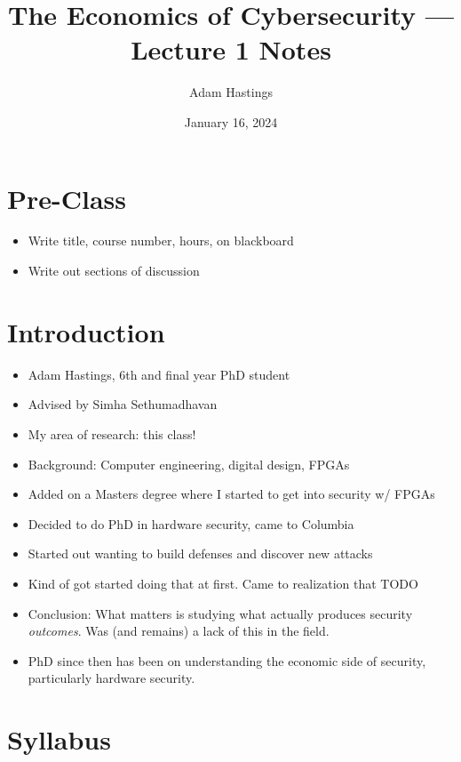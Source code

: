 \documentclass[11pt]{article}
\title{The Economics of Cybersecurity --- Lecture 1 Notes}
\date{January 16, 2024}
\author{Adam Hastings}
\begin{document}
\maketitle

\section*{Pre-Class}
\begin{itemize}
    \item Write title, course number, hours, on blackboard
    \item Write out sections of discussion
\end{itemize}

\section{Introduction}
\begin{itemize}
    \item Adam Hastings, 6th and final year PhD student
    \item Advised by Simha Sethumadhavan
    \item My area of research: this class! 
    \item Background: Computer engineering, digital design, FPGAs
    \item Added on a Masters degree where I started to get into security w/ FPGAs
    \item Decided to do PhD in hardware security, came to Columbia
    \item Started out wanting to build defenses and discover new attacks 
    \item Kind of got started doing that at first. Came to realization that TODO
    \item Conclusion: What matters is studying what actually produces security {\it outcomes}. Was (and remains) a lack of this in the field.
    \item PhD since then has been on understanding the economic side of security, particularly hardware security.
\end{itemize}


\section{Syllabus}
\end{document}
